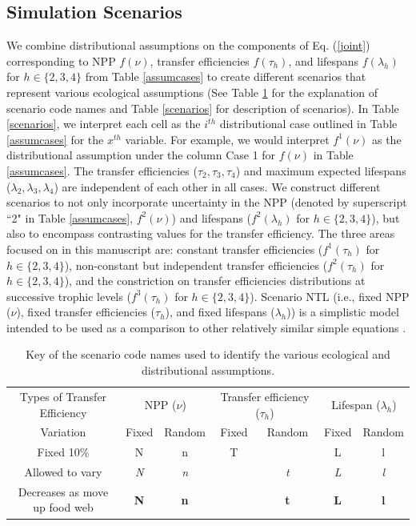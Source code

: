 \documentclass[oneside,12pt,final]{sty/ucthesis-CA2012}
\let\cite\citep                             %
\begin{document}
\begin{mainmatter}
\subsection*{Simulation Scenarios}
We combine distributional assumptions on the components of Eq. (\ref{joint}) corresponding to NPP $f(\nu)$, transfer efficiencies $f(\tau_h)$, and lifespans $f(\lambda_h)$ for $h \in \{2, 3, 4\}$ from Table \ref{assumcases} to create different scenarios that represent various ecological assumptions (See Table \ref{scenariosids} for the explanation of scenario code names and Table \ref{scenarios} for description of scenarios). In Table \ref{scenarios}, we interpret each cell as the $i^{th}$ distributional case outlined in Table \ref{assumcases} for the $x^{th}$ variable. For example, we would interpret $f^1(\nu)$ as the distributional assumption under the column Case 1 for $f(\nu)$ in Table \ref{assumcases}. The transfer efficiencies ($\tau_2, \tau_3, \tau_4$) and maximum expected lifespans ($\lambda_2, \lambda_3, \lambda_4$) are independent of each other in all cases. We construct different scenarios to not only incorporate uncertainty in the NPP (denoted by superscript ``2" in Table \ref{assumcases}, $f^2(\nu)$) and lifespans ($f^2(\lambda_h)$ for $h \in \{2, 3, 4\}$), but also to encompass contrasting values for the transfer efficiency. The three areas focused on in this manuscript are: constant transfer efficiencies ($f^1(\tau_h)$ for $h \in \{2, 3, 4\}$), non-constant but independent transfer efficiencies ($f^2(\tau_h)$ for $h \in \{2, 3, 4\}$), and the constriction on transfer efficiencies distributions at successive trophic levels ($f^3(\tau_h)$ for $h \in \{2, 3, 4\}$). Scenario NTL (i.e., fixed NPP ($\nu$), fixed transfer efficiencies ($\tau_h$), and fixed lifespans ($\lambda_h$)) is a simplistic model intended to be used as a comparison to other relatively similar simple equations \cite{pauly1995primary, cury2005trophodynamic, chassot2010global, watson2014primary}. 

\begin{table}[H]
\centering
\caption{Key of the scenario code names used to identify the various ecological and distributional assumptions.}
\begin{tabular}{|c|cc|cc|cc|}
  \hline Types of Transfer Efficiency & \multicolumn{2}{c|}{NPP ($\nu$)} & \multicolumn{2}{c|}{Transfer efficiency ($\tau_h$)}  &  \multicolumn{2}{c|}{Lifespan ($\lambda_h$)}  \\ 
  Variation & Fixed & Random & Fixed & Random & Fixed & Random  \\
    \hline
  Fixed 10\% & N & n & T &   & L & l \\
  Allowed to vary & \textit{N} & \textit{n} & & \textit{t} & \textit{L} & \textit{l} \\
  Decreases as move up food web & \textbf{N} & \textbf{n} & & \textbf{t} & \textbf{L} & \textbf{l} \\
  \hline
\end{tabular} 
\label{scenariosids}
\end{table}


\end{mainmatter}
\end{document}
